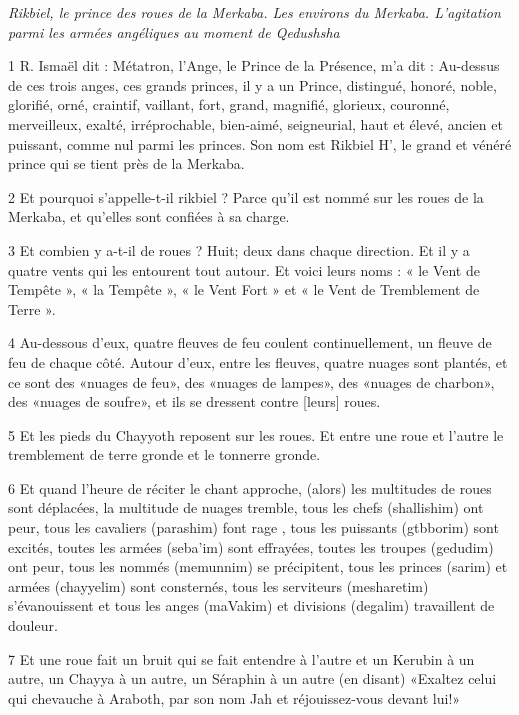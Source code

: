\par \textit{Rikbiel, le prince des roues de la Merkaba. Les environs du Merkaba. L'agitation parmi les armées angéliques au moment de Qedushsha}

\par 1 R. Ismaël dit : Métatron, l'Ange, le Prince de la Présence, m'a dit : Au-dessus de ces trois anges, ces grands princes, il y a un Prince, distingué, honoré, noble, glorifié, orné, craintif, vaillant, fort, grand, magnifié, glorieux, couronné, merveilleux, exalté, irréprochable, bien-aimé, seigneurial, haut et élevé, ancien et puissant, comme nul parmi les princes. Son nom est Rikbiel H', le grand et vénéré prince qui se tient près de la Merkaba.

\par 2 Et pourquoi s'appelle-t-il rikbiel ? Parce qu'il est nommé sur les roues de la Merkaba, et qu'elles sont confiées à sa charge.

\par 3 Et combien y a-t-il de roues ? Huit; deux dans chaque direction. Et il y a quatre vents qui les entourent tout autour. Et voici leurs noms : « le Vent de Tempête », « la Tempête », « le Vent Fort » et « le Vent de Tremblement de Terre ».

\par 4 Au-dessous d'eux, quatre fleuves de feu coulent continuellement, un fleuve de feu de chaque côté. Autour d'eux, entre les fleuves, quatre nuages sont plantés, et ce sont des «nuages de feu», des «nuages de lampes», des «nuages de charbon», des «nuages de soufre», et ils se dressent contre [leurs] roues.

\par 5 Et les pieds du Chayyoth reposent sur les roues. Et entre une roue et l’autre le tremblement de terre gronde et le tonnerre gronde.

\par 6 Et quand l'heure de réciter le chant approche, (alors) les multitudes de roues sont déplacées, la multitude de nuages ​​tremble, tous les chefs (shallishim) ont peur, tous les cavaliers (parashim) font rage , tous les puissants (gtbborim) sont excités, toutes les armées (seba'im) sont effrayées, toutes les troupes (gedudim) ont peur, tous les nommés (memunnim) se précipitent, tous les princes (sarim) et armées (chayyelim) sont consternés, tous les serviteurs (mesharetim) s'évanouissent et tous les anges (maVakim) et divisions (degalim) travaillent de douleur.

\par 7 Et une roue fait un bruit qui se fait entendre à l'autre et un Kerubin à un autre, un Chayya à un autre, un Séraphin à un autre (en disant) «Exaltez celui qui chevauche à Araboth, par son nom Jah et réjouissez-vous devant lui!»

